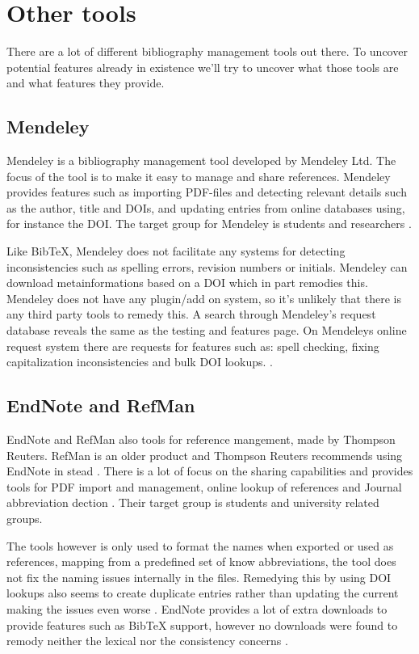 \section{Other tools}
There are a lot of different bibliography management tools out there.
To uncover potential features already in existence we'll try to
uncover what those tools are and what features they provide.

\subsection{Mendeley}
Mendeley is a bibliography management tool developed by Mendeley Ltd.
The focus of the tool is to make it easy to manage and share
references.  Mendeley provides features such as importing PDF-files
and detecting relevant details such as the author, title and DOIs, and
updating entries from online databases using, for instance the DOI.
The target group for Mendeley is students and researchers
\cite{mendeley_features}.

Like BibTeX, Mendeley does not facilitate any systems for detecting
inconsistencies such as spelling errors, revision numbers or initials.
Mendeley can download metainformations based on a DOI which in part
remodies this.  Mendeley does not have any plugin/add on system, so
it's unlikely that there is any third party tools to remedy this. A
search through Mendeley's request database reveals the same as the
testing and features page.  On Mendeleys online request system there
are requests for features such as: spell checking, fixing
capitalization inconsistencies and bulk DOI lookups.
\cite{mendeley_request_spellcheck, mendeley_request_lowercase,
  mendeley_request_capitalization, mendeley_request_bulk_doi}.

\subsection{EndNote and RefMan}
EndNote and RefMan also tools for reference mangement, made by
Thompson Reuters.  RefMan is an older product and Thompson Reuters
recommends using EndNote in stead \cite{refman_switch,
  refman_features}.  There is a lot of focus on the sharing
capabilities and provides tools for PDF import and management, online
lookup of references and Journal abbreviation dection
\cite{endnote_basic_features, endnote_x7_features}.  Their target
group is students and university related groups.

The tools however is only used to format the names when exported or
used as references, mapping from a predefined set of know
abbreviations, the tool does not fix the naming issues internally in
the files\cite{endnote_terms_journals}.  Remedying this by using DOI
lookups also seems to create duplicate entries rather than updating
the current making the issues even worse .
EndNote provides a lot of extra downloads to provide features such as
Bib{\TeX} support, however no downloads were found to remody neither
the lexical nor the consistency concerns \cite{endnote_downloads}.

